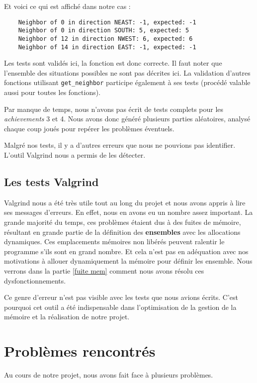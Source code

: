 \documentclass[a4paper]{article}
\begin{document}
Et voici ce qui est affiché dans notre cas :

\begin{verbatim}
    Neighbor of 0 in direction NEAST: -1, expected: -1
    Neighbor of 0 in direction SOUTH: 5, expected: 5
    Neighbor of 12 in direction NWEST: 6, expected: 6
    Neighbor of 14 in direction EAST: -1, expected: -1
\end{verbatim}

Les tests sont validés ici, la fonction est donc correcte. Il faut noter que l'ensemble des situations possibles ne sont pas décrites ici. La validation d'autres fonctions utilisant \verb|get_neighbor| participe également à ses tests (procédé valable aussi pour toutes les fonctions).

Par manque de temps, nous n'avons pas écrit de tests complets pour les \emph{achievements} 3 et 4. Nous avons donc généré plusieurs parties aléatoires, analysé chaque coup joués pour repérer les problèmes éventuels.

\vspace{0.5cm}

Malgré nos tests, il y a d'autres erreurs que nous ne pouvions pas identifier. L'outil Valgrind nous a permis de les détecter.

\subsection{Les tests Valgrind}
\label{valgrind tests}

Valgrind nous a été très utile tout au long du projet et nous avons appris à lire ses messages d'erreurs. En effet, nous en avons eu un nombre assez important. La grande majorité du temps, ces problèmes étaient dus à des fuites  de mémoire, résultant en grande partie de la définition des \textbf{ensembles} avec les allocations dynamiques. Ces emplacements mémoires non libérés peuvent ralentir le programme s'ils sont en grand nombre. Et cela n'est pas en adéquation avec nos motivations à allouer dynamiquement la mémoire pour définir les ensemble. Nous verrons dans la partie \ref{fuite mem} comment nous avons résolu ces dysfonctionnements.

Ce genre d'erreur n'est pas visible avec les tests que nous avions écrits. C'est pourquoi cet outil a été indispensable dans l'optimisation de la gestion de la mémoire et la réalisation de notre projet.


\section{Problèmes rencontrés}
\label{pb}
Au cours de notre projet, nous avons fait face à plusieurs problèmes.
\end{document}
